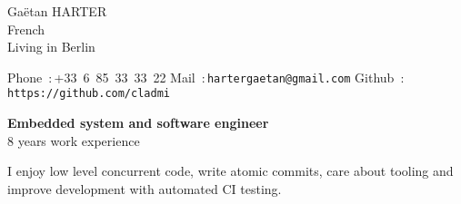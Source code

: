 \documentclass{cv}
\begin{document}
\begin{chapeau}
\hspace{1cm}
\begin{adresse}
        Gaëtan HARTER\\
        French \\
        Living in Berlin
\end{adresse}
\begin{etatcivil}
        Phone~:\,+33~6~85~33~33~22
        Mail~:\,\texttt{hartergaetan@gmail.com}
        Github~:\,\texttt{https://github.com/cladmi}
\end{etatcivil}
\hspace{2cm}
\end{chapeau}

\begin{center}
        \textbf{\Large Embedded system and software engineer\\}
        \large 8 years work experience\\

        \vspace{0.5em}
        \begin{minipage}{15cm}
          \begin{center}
            \large I enjoy low level concurrent code, write atomic commits, care about tooling and improve development with automated CI testing.
          \end{center}
        \end{minipage}
\end{center}
\end{document}
